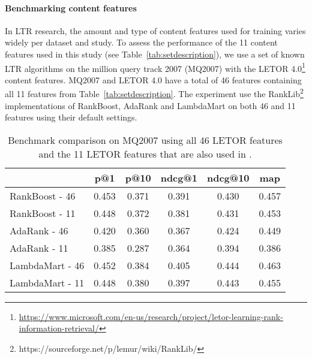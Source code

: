 
\paragraph{Benchmarking content features}
In \ac{LTR} research, the amount and type of content features used for training varies widely per dataset and study.
To assess the performance of the 11 content features used in this study (see Table~\ref{tab:setdescription}), we use a set of known LTR algorithms on the million query track 2007 (MQ2007)\cite{allan2007million} with the LETOR 4.0\footnote{\url{https://www.microsoft.com/en-us/research/project/letor-learning-rank-information-retrieval/}} content features.
MQ2007 and LETOR 4.0 have a total of 46 features containing all 11 features from Table~\ref{tab:setdescription}.
The experiment use the RankLib\footnote{https://sourceforge.net/p/lemur/wiki/RankLib/} implementations of RankBoost, AdaRank and LambdaMart on both 46 and 11 features using their default settings. 

\begin{table}[h]
\caption{Benchmark comparison on MQ2007 using all 46 LETOR features and the 11 LETOR features that are also used in \datasetname.}
\label{tab:11vs46}
\centering
\begin{tabular}{lccccc}
\toprule
           & p@1  & p@10   & ndcg@1 & ndcg@10 & map \\ 
\midrule
RankBoost - 46 & 0.453 & 0.371 & 0.391 & 0.430  & 0.457 \\
RankBoost - 11 & 0.448 & 0.372 & 0.381  & 0.431   & 0.453 \\
\midrule
AdaRank - 46  & 0.420 & 0.360 & 0.367 & 0.424  & 0.449 \\
AdaRank - 11  & 0.385 & 0.287 & 0.364  & 0.394   & 0.386 \\ 
\midrule
LambdaMart - 46 & 0.452 & 0.384 & 0.405 & 0.444  & 0.463 \\
LambdaMart - 11 & 0.448 & 0.380 & 0.397  & 0.443   & 0.455 \\
\bottomrule
\end{tabular}
\end{table}